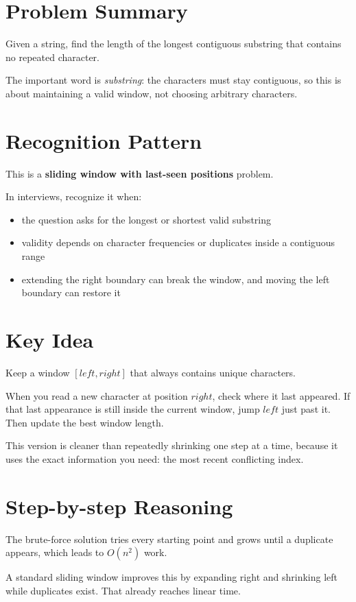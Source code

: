 \section{Problem Summary}
Given a string, find the length of the longest contiguous substring that contains no repeated character.

The important word is \emph{substring}: the characters must stay contiguous, so this is about maintaining a valid window, not choosing arbitrary characters.

\section{Recognition Pattern}
This is a \textbf{sliding window with last-seen positions} problem.

In interviews, recognize it when:
\begin{itemize}
\item the question asks for the longest or shortest valid substring
\item validity depends on character frequencies or duplicates inside a contiguous range
\item extending the right boundary can break the window, and moving the left boundary can restore it
\end{itemize}

\section{Key Idea}
Keep a window \([left, right]\) that always contains unique characters.

When you read a new character at position \(right\), check where it last appeared. If that last appearance is still inside the current window, jump \(left\) just past it. Then update the best window length.

This version is cleaner than repeatedly shrinking one step at a time, because it uses the exact information you need: the most recent conflicting index.

\section{Step-by-step Reasoning}
The brute-force solution tries every starting point and grows until a duplicate appears, which leads to \(O(n^2)\) work.

A standard sliding window improves this by expanding right and shrinking left while duplicates exist. That already reaches linear time.


